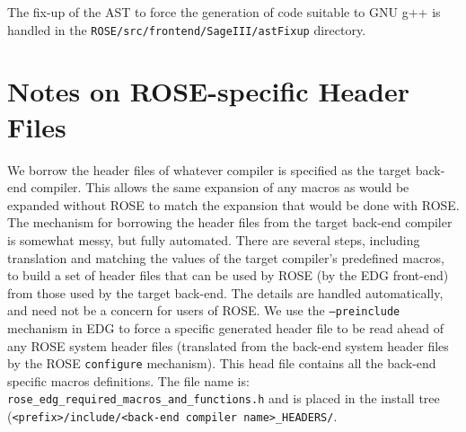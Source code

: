            The fix-up of the AST to force the generation of code suitable to GNU g++ is
           handled in the {\tt ROSE/src/frontend/SageIII/astFixup} directory.



\section{Notes on ROSE-specific Header Files }

    We borrow the header files of whatever compiler is specified as the target back-end
    compiler.  This allows the same expansion of any macros as would be expanded without
    ROSE to match the expansion that would be done with ROSE.  The mechanism for borrowing
    the header files from the target back-end compiler is somewhat messy, but fully
    automated.  There are several steps, including translation and matching the values of
    the target compiler's predefined macros, to build a set of header files that can be
    used by ROSE (by the EDG front-end) from those used by the target back-end.
    The details are handled automatically, and need not be a concern for users of ROSE.
    We use the {\tt --preinclude} mechanism in EDG to force a specific generated header file 
    to be read ahead of any ROSE system header files (translated from the back-end system
    header files by the ROSE {\tt configure} mechanism).  This head file contains
    all the back-end specific macros definitions. The file name is:
    {\tt rose\_edg\_required\_macros\_and\_functions.h} and is placed in the install
    tree ({\tt <prefix>/include/<back-end compiler name>\_HEADERS/}.


